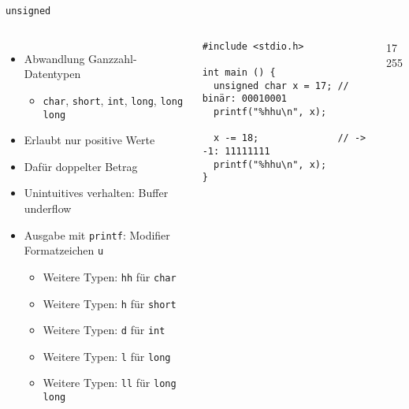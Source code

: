 
\begin{frame}[fragile]{\texttt{unsigned}}
%
\begin{columns}[T]
\begin{itemize}
\item Abwandlung Ganzzahl-Datentypen
	\begin{itemize}
	\item \texttt{char}, \texttt{short}, \texttt{int}, \texttt{long},
		  \texttt{long long}
	\end{itemize}
\item Erlaubt nur positive Werte
\item Dafür doppelter Betrag
\item Unintuitives verhalten: Buffer underflow
\item Ausgabe mit \texttt{printf}: Modifier Formatzeichen \texttt{u}
	\begin{itemize}
	\item Weitere Typen: \texttt{hh} für \texttt{char}
	\item Weitere Typen: \texttt{h} für \texttt{short}
	\item Weitere Typen: \texttt{d} für \texttt{int}
	\item Weitere Typen: \texttt{l} für \texttt{long}
	\item Weitere Typen: \texttt{ll} für \texttt{long long}
	\end{itemize}
\end{itemize}
%
\begin{codebox}
\begin{verbatim}
#include <stdio.h>

int main () {
  unsigned char x = 17; // binär: 00010001
  printf("%hhu\n", x);
  
  x -= 18;              // -> -1: 11111111
  printf("%hhu\n", x);
}
\end{verbatim}
\end{codebox}
%
\begin{cmdbox}[Ausgabe]
\scriptsize
17\\
255
\end{cmdbox}
\end{columns}
%
\end{frame}


